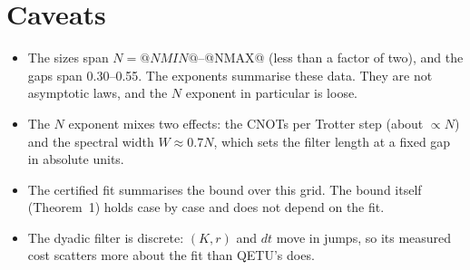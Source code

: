 \documentclass[10pt]{article}
\begin{document}
\section{Caveats}
\begin{itemize}
\item The sizes span $N=@NMIN@$--@NMAX@ (less than a factor of two), and the gaps span 0.30--0.55. The exponents
summarise these data. They are not asymptotic laws, and the $N$ exponent in particular is loose.
\item The $N$ exponent mixes two effects: the CNOTs per Trotter step (about $\propto N$) and the spectral width
$W\approx0.7N$, which sets the filter length at a fixed gap in absolute units.
\item The certified fit summarises the bound over this grid. The bound itself (Theorem~1) holds case by case
and does not depend on the fit.
\item The dyadic filter is discrete: $(K,r)$ and $dt$ move in jumps, so its measured cost scatters more about
the fit than QETU's does.
\end{itemize}
\end{document}

